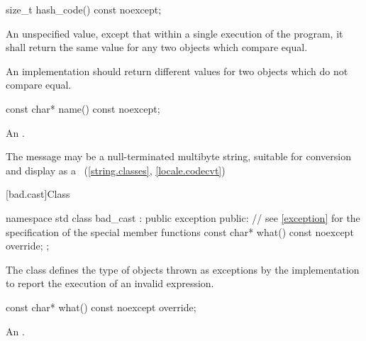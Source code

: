 %
\begin{itemdecl}
size_t hash_code() const noexcept;
\end{itemdecl}

\begin{itemdescr}
\pnum
\returns An unspecified value, except that within a single execution of the
program, it shall return the same value for any two 
objects which compare equal.

\pnum
\remarks An implementation should return different values for two
 objects which do not compare equal.
\end{itemdescr}


%
\begin{itemdecl}
const char* name() const noexcept;
\end{itemdecl}

\begin{itemdescr}
\pnum
\returns
An  \ntbs{}.

\pnum
\remarks
The message may be a null-terminated multibyte string,
suitable for conversion and display as a
~(\ref{string.classes}, \ref{locale.codecvt})
\end{itemdescr}

[bad.cast]{Class }

%
%
\begin{codeblock}
namespace std {
  class bad_cast : public exception {
  public:
    // see \ref{exception} for the specification of the special member functions
    const char* what() const noexcept override;
  };
}
\end{codeblock}

\pnum
The class
defines the type of objects thrown
as exceptions by the implementation to report the execution of an invalid
%
expression.

%
\begin{itemdecl}
const char* what() const noexcept override;
\end{itemdecl}

\begin{itemdescr}
\pnum
\returns
An  \ntbs{}.
\end{itemdescr}

